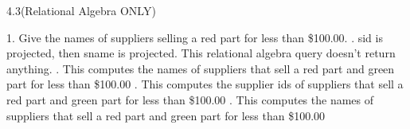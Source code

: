 \begin{problem}{4.3(Relational Algebra ONLY)}
\end{problem}

\begin{problem}{4.4}
  \begin{solution}
    1. Give the names of suppliers selling a red part for less than \$100.00.
    . sid is projected, then sname is projected. This relational algebra query doesn't return anything.
    . This computes the names of suppliers that sell a red part and green part for less than \$100.00
    . This computes the supplier ids of suppliers that sell a red part and green part for less than \$100.00
    . This computes the names of suppliers that sell a red part and green part for less than \$100.00
  \end{solution}
\end{problem}

